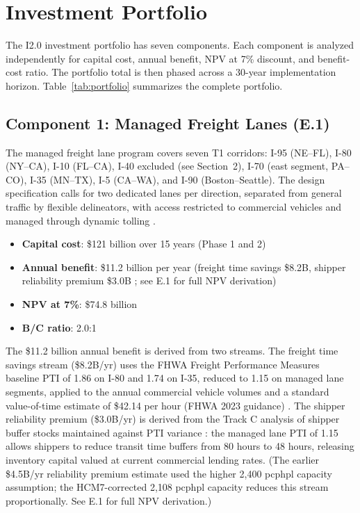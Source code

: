 \section{Investment Portfolio}

The I2.0 investment portfolio has seven components. Each component is analyzed independently for capital cost, annual benefit, NPV at 7\% discount, and benefit-cost ratio. The portfolio total is then phased across a 30-year implementation horizon. Table~\ref{tab:portfolio} summarizes the complete portfolio.

\subsection{Component 1: Managed Freight Lanes (E.1)}

The managed freight lane program covers seven T1 corridors: I-95 (NE--FL), I-80 (NY--CA), I-10 (FL--CA), I-40 excluded (see Section~2), I-70 (east segment, PA--CO), I-35 (MN--TX), I-5 (CA--WA), and I-90 (Boston--Seattle). The design specification calls for two dedicated lanes per direction, separated from general traffic by flexible delineators, with access restricted to commercial vehicles and managed through dynamic tolling \citep{ROUTE_E1,TRB_ML2012}.

\begin{itemize}
  \item \textbf{Capital cost}: \$121 billion over 15 years (Phase 1 and 2)
  \item \textbf{Annual benefit}: \$11.2 billion per year (freight time savings \$8.2B, shipper reliability premium \$3.0B \citep{ROUTE_C1,ROUTE_E1}; see E.1 for full NPV derivation)
  \item \textbf{NPV at 7\%}: \$74.8 billion
  \item \textbf{B/C ratio}: 2.0:1
\end{itemize}

The \$11.2 billion annual benefit is derived from two streams. The freight time savings stream (\$8.2B/yr) uses the FHWA Freight Performance Measures baseline PTI of 1.86 on I-80 and 1.74 on I-35, reduced to 1.15 on managed lane segments, applied to the annual commercial vehicle volumes and a standard value-of-time estimate of \$42.14 per hour (FHWA 2023 guidance) \citep{FHWA_freight2023}. The shipper reliability premium (\$3.0B/yr) is derived from the Track C analysis of shipper buffer stocks maintained against PTI variance \citep{ROUTE_C1}: the managed lane PTI of 1.15 allows shippers to reduce transit time buffers from 80 hours to 48 hours, releasing inventory capital valued at current commercial lending rates. (The earlier \$4.5B/yr reliability premium estimate used the higher 2,400 pcphpl capacity assumption; the HCM7-corrected 2,108 pcphpl capacity reduces this stream proportionally. See E.1 for full NPV derivation.)

